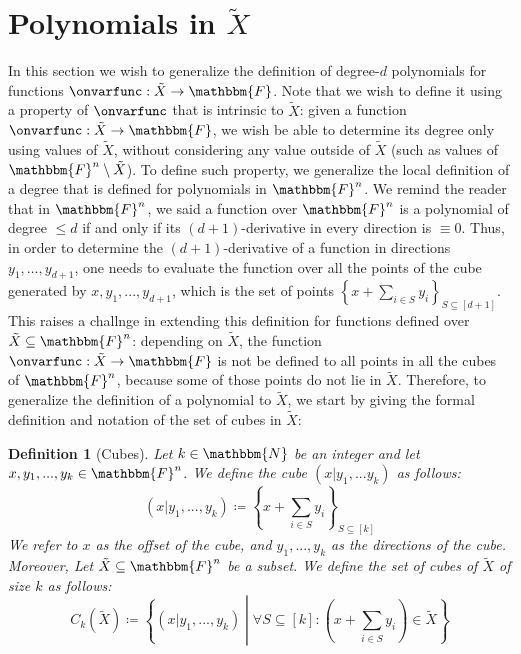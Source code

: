 \documentclass[10pt,a4paper]{article}
\newtheorem{definition}[theorem]{Definition}
\newcommand{\definedas}[0]{\coloneqq}
\newcommand{\set}[1]{\left\{ #1 \right\}}
\newcommand{\suchthat}[0]{\middle|}
\newcommand{\basefield}[0]{\mathbbm{F}}
\newcommand{\blocklength}[0]{n}
\newcommand{\field}[0]{\basefield^{\blocklength}}
\newcommand{\degree}[0]{d}
\newcommand{\funcdef}[3]{#1:#2\rightarrow#3}
\newcommand{\cube}[2]{(#1|#2)}
\newcommand{\cubes}[2]{C_{#1}(#2)}
\newcommand{\naturalnumbersset}[0]{\mathbbm{N}}
\newcommand{\variety}{{\tilde{X}}}
\newcommand{\titlevariety}{\texorpdfstring{$\variety$}{X}}
\begin{document}
\section[Polynomials in \titlevariety]{Polynomials in \titlevariety}\label{sec:polynomials_in_X}
In this section we wish to generalize the definition of degree-$\degree$ polynomials for functions $\funcdef{\onvarfunc}{\variety}{\basefield}$.
Note that we wish to define it using a property of $\onvarfunc$ that is intrinsic to $\variety$: given a function $\funcdef{\onvarfunc}{\variety}{\basefield}$,
we wish be able to determine its degree only using values of $\variety$, without considering any value outside of $\variety$ (such as values of $\field \setminus \variety$).
\newline
To define such property, we generalize the local definition of a degree that is defined for polynomials in $\field$.
We remind the reader that in $\field$, we said a function over $\field$ is a polynomial of degree $\leq \degree$ if and only if its $(\degree+1)$-derivative in every direction is $\equiv 0$.
Thus, in order to determine the $(\degree+1)$-derivative of a function in directions $y_1,...,y_{\degree+1}$, one needs to evaluate the function over all the points of the cube generated by $x,y_1,...,y_{\degree+1}$,
which is the set of points $\set{x + \sum_{i \in S}{y_i}}_{S \subseteq [\degree+1]}$.
This raises a challnge in extending this definition for functions defined over $\variety \subseteq \field$:
depending on $\variety$, the function $\funcdef{\onvarfunc}{\variety}{\basefield}$ is not be defined to all points in all the cubes of $\field$, because some of those points do not lie in $\variety$.
\newline
Therefore, to generalize the definition of a polynomial to $\variety$, we start by giving the formal definition and notation of the set of cubes in $\variety$:
\begin{definition}[Cubes]
    Let $k \in \naturalnumbersset$ be an integer and let $x, y_1,...,y_{k} \in \field$.
    We define the cube $\cube{x}{y_1,...y_{k}}$ as follows:
    \[
        \cube{x}{y_1,...,y_{k}} \definedas \set{x + \sum_{i \in S}{y_i}}_{S \subseteq [k]}
    \]
    We refer to $x$ as the \emph{offset} of the cube, and $y_1,...,y_{k}$ as the \emph{directions} of the cube.
    \newline
    Moreover, Let $\variety \subseteq \field$ be a subset.
    We define the \emph{set of cubes of $\variety$ of size $k$} as follows:
    \[
        \cubes{k}{\variety} \definedas
            \set{\cube{x}{y_1,...,y_{k}} \suchthat \forall S \subseteq[k]: (x + \sum_{i \in S}{y_i}) \in \variety}
    \]
\end{definition}
\end{document}
